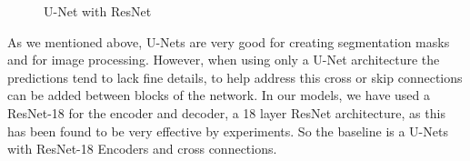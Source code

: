 \documentclass[UTF8]{article}
\begin{document}
\begin{enumerate}
\begin{figure}[htbp]
		\caption{U-Net with ResNet}
		\label{fig}
		\end{figure}
		\noindent As we mentioned above, U-Nets are very good for creating segmentation masks and for image processing. However, when using only a U-Net architecture the predictions tend to lack fine details, to help address this cross or skip connections can be added between blocks of the network. In our models, we have used a ResNet-18 for the encoder and decoder, a 18 layer ResNet architecture, as this has been found to be very effective by experiments. So the baseline is a U-Nets with ResNet-18 Encoders and cross connections.
		

	\end{enumerate}
\end{document}
